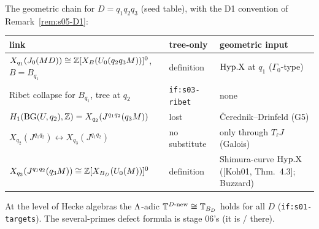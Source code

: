 The geometric chain for $D=q_1q_2q_3$ (seed table), with the D1 convention of Remark~\ref{rem:s05-D1}:
\begin{center}\small
\begin{tabular}{@{}p{5.9cm}p{3.4cm}p{4.9cm}@{}}
\toprule
link & tree-only & geometric input\\\midrule
$X_{q_1}(J_0(MD))\cong\mathbb{Z}[X_B(U_0(q_2q_3M))]^0$, $B=B_{q_1}$ & definition & $\mathrm{Hyp.X}$ at $q_1$ ($\Gamma_0$-type)\\
Ribet collapse for $B_{q_1}$, tree at $q_2$ & \texttt{if:s03-ribet} & none\\
$H_1(\mathrm{BG}(U,q_2),\mathbb{Z})=X_{q_2}(J^{q_1q_2}(q_3M))$ & lost & Čerednik--Drinfeld (G5)\\
$X_{q_2}(J^{q_1q_2})\leftrightarrow X_{q_3}(J^{q_1q_2})$ & no substitute & only through $T_\ell J$ (Galois)\\
$X_{q_3}(J^{q_1q_2}(q_3M))\cong\mathbb{Z}[X_{B_D}(U_0(M))]^0$ & definition & Shimura-curve $\mathrm{Hyp.X}$ ([Koh01, Thm.~4.3]; Buzzard)\\
\bottomrule
\end{tabular}
\end{center}
At the level of Hecke algebras the $\Lambda$-adic $\mathbb{T}^{D\text{-new}}\cong\mathbb{T}_{B_D}$ holds for all $D$ (\texttt{if:s01-targets}). The
several-primes defect formula is stage 06's (it is \stconj{}/\stsketch{} there).

